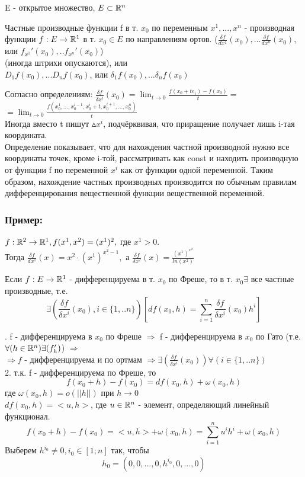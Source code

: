 E - открытое множество, $E\subset\mathbb{R}^n$
\\
\begin{opred}
Частные производные функции f в т. $x_0$ по переменным $x^1,...,x^n$ - производная функции $f:E\to\mathbb{R}^1$ в т. $x_0\in E$ по направлениям ортов.
($\frac{\delta f}{dx^1}(x_0),...\frac{\delta f}{dx^n}(x_0)$, или $f_{x^1}'(x_0),.. f_{x^n}'(x_0)$)
\\
(иногда штрихи опускаются), или
\\
$D_1 f(x_0),... D_n f(x_0)$, или $\delta_1 f(x_0),... \delta_n f(x_0)$
\end{opred}

Согласно определениям:
$\frac{\delta f}{\delta x^i}(x_0) = \lim_{t\to 0}\frac{f(x_0+te_i)-f(x_0)}{t} = $
\\
$ = \lim_{t\to 0}\frac{f(x_0^1,...,x_0^{i-1},x_0^i+t,x_0^{i+1},...,x_0^n)}{t}$
\\
Иногда вместо t пишут $\vartriangle x^i$, подчёрквивая, что приращение получает лишь i-тая координата.
\\
Определение показывает, что для нахождения частной производной нужно все координаты точек, кроме i-той, рассматривать как const и находить производную от функции f по переменной $x^i$ как от функции одной переменной. Таким образом, нахождение частных производных производится по обычным правилам дифференцирования вещественной функции вещественной переменной.
\subsubsection{Пример:}
$f:\mathbb{R}^2\to \mathbb{R}^1, f(x^1,x^2)=(x^1)^2,$ где $x^1>0.$
\\
Тогда $\frac{\delta f}{dx^1}(x) = x^2\cdot(x^1)^{x^2-1},$ а $\frac{\delta f}{\delta x^2}(x)=\frac{(x^1)^{x^2}}{ln (x^2)}$
\\
\begin{teorema}
Если $f:E\to\mathbb{R}^1$ - дифференцируема в т. $x_0$ по Фреше, то в т. $x_0 \exists$ все частные производные, т.е.
$$
\exists(\frac{\delta f}{\delta x^i}(x_0), i\in\{1,..n\})[df(x_0,h)=\sum_{i=1}^{n}\frac{\delta f}{\delta x^i}(x_0)h^i]
$$  
\end{teorema}
. f - дифференцируема в $x_0$ по Фреше $\Rightarrow$ f - дифференцируема в $x_0$ по Гато (т.е.$\forall(h\in\mathbb{R}^n)\exists(f_h')$) $\Rightarrow$
\\
$\Rightarrow f$ - дифференцируема и по ортмам $\Rightarrow \exists(\frac{\delta f}{\delta x^i}(x_0))\forall(i\in\{1,..n\})$
\\
2. т.к. f - дифференцируема по Фреше, то 
$$
f(x_0+h)-f(x_0) = df(x_0,h)+\omega(x_0,h)
$$
где $\omega(x_0,h) = o(||h||)$ при $h\to 0$
\\
$df(x_0,h) = <u,h>$, где $u\in\mathbb{R}^n$ - элемент, определяющий линейный функционал.
$$
f(x_0+h) - f(x_0) = <u,h> + \omega(x_0,h) = \sum_{i=1}^{n}u^i h^i + \omega(x_0,h)
$$
Выберем $h^{i_0}\ne 0, i_0\in[1;n]$ так, чтобы 
$$
h_0 = (0,0,...,0,h^{i_0},0,...,0)
$$

